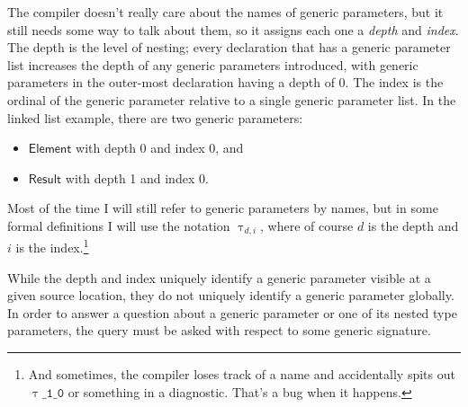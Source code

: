 \documentclass[headsepline,bibliography=totoc]{scrreport}
\newcommand{\genericparam}[1]{\bm{\mathsf{#1}}}
\theoremstyle{definition}
\theoremstyle{definition}
\theoremstyle{definition}
\begin{document}
The compiler doesn't really care about the names of generic parameters, but it still needs some way to talk about them, so it assigns each one a \emph{depth} and \emph{index}. The depth is the level of nesting; every declaration that has a generic parameter list increases the depth of any generic parameters introduced, with generic parameters in the outer-most declaration having a depth of 0. The index is the ordinal of the generic parameter relative to a single generic parameter list. In the linked list example, there are two generic parameters:
\begin{itemize}
\item $\genericparam{Element}$ with depth 0 and index 0, and
\item $\genericparam{Result}$ with depth 1 and index 0.
\end{itemize}
Most of the time I will still refer to generic parameters by names, but in some formal definitions I will use the notation $\uptau_{d,i}$, where of course $d$ is the depth and $i$ is the index.\footnote{And sometimes, the compiler loses track of a name and accidentally spits out $\mathtt{\uptau\_1\_0}$ or something in a diagnostic. That's a bug when it happens.}

While the depth and index uniquely identify a generic parameter visible at a given source location, they do not uniquely identify a generic parameter globally. In order to answer a question about a generic parameter or one of its nested type parameters, the query must be asked with respect to some generic signature.
\end{document}
